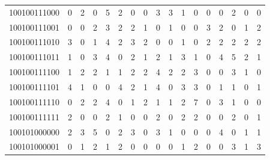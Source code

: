 \documentclass[10pt,a4paper]{article}
\begin{document}
\begin{longtable}{ |c|c|c|c|c|c|c|c|c|c|c|c|c|c|c|c|c| }
    100100111000              & 0                            & 2                                & 0                            & 5                              & 2   & 0   & 0   & 3   & 3   & 1   & 0   & 0   & 0   & 2   & 0   & 0   \\
    100100111001              & 0                            & 0                                & 2                            & 3                              & 2   & 2   & 1   & 0   & 1   & 0   & 0   & 3   & 2   & 0   & 1   & 2   \\
    100100111010              & 3                            & 0                                & 1                            & 4                              & 2   & 3   & 2   & 0   & 0   & 1   & 0   & 2   & 2   & 2   & 2   & 2   \\
    100100111011              & 1                            & 0                                & 3                            & 4                              & 0   & 2   & 1   & 2   & 1   & 3   & 1   & 0   & 4   & 5   & 2   & 1   \\
    100100111100              & 1                            & 2                                & 2                            & 1                              & 1   & 2   & 2   & 4   & 2   & 2   & 3   & 0   & 0   & 3   & 1   & 0   \\
    100100111101              & 4                            & 1                                & 0                            & 0                              & 4   & 2   & 1   & 4   & 0   & 3   & 3   & 0   & 1   & 1   & 0   & 1   \\
    100100111110              & 0                            & 2                                & 2                            & 4                              & 0   & 1   & 2   & 1   & 1   & 2   & 7   & 0   & 3   & 1   & 0   & 0   \\
    100100111111              & 2                            & 0                                & 0                            & 2                              & 1   & 0   & 0   & 2   & 0   & 2   & 2   & 0   & 0   & 2   & 0   & 1   \\
    100101000000              & 2                            & 3                                & 5                            & 0                              & 2   & 3   & 0   & 3   & 1   & 0   & 0   & 0   & 4   & 0   & 1   & 1   \\
    100101000001              & 0                            & 1                                & 2                            & 1                              & 2   & 0   & 0   & 0   & 0   & 1   & 2   & 0   & 0   & 3   & 1   & 3   \\

\end{longtable}
\end{document}
